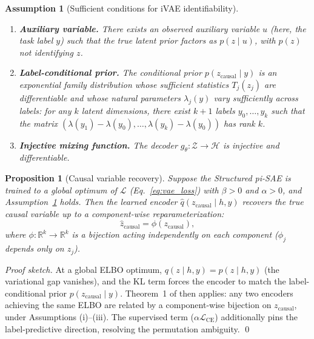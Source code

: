 \documentclass{article}
\newcommand{\R}{\mathbb{R}}
\newtheorem{assumption}{Assumption}
\newtheorem{proposition}{Proposition}
\begin{document}
\begin{assumption}[Sufficient conditions for iVAE identifiability]
\label{ass:ivae}
\leavevmode
\begin{enumerate}[leftmargin=*,label=(\roman*)]
    \item \textbf{Auxiliary variable.} There exists an observed auxiliary
    variable $u$ (here, the task label $y$) such that the true latent prior
    factors as $p(z \mid u)$, with $p(z)$ not identifying $z$.
    \item \textbf{Label-conditional prior.} The conditional prior
    $p(z_\text{causal} \mid y)$ is an exponential family distribution whose
    sufficient statistics $T_j(z_j)$ are differentiable and whose natural
    parameters $\lambda_j(y)$ vary sufficiently across labels: for any
    $k$ latent dimensions, there exist $k{+}1$ labels $y_0, \ldots, y_k$
    such that the matrix $(\lambda(y_1) - \lambda(y_0), \ldots,
    \lambda(y_k) - \lambda(y_0))$ has rank $k$.
    \item \textbf{Injective mixing function.} The decoder
    $g_\theta: \mathcal{Z} \to \mathcal{H}$ is injective and
    differentiable.
\end{enumerate}
\end{assumption}

\begin{proposition}[Causal variable recovery]
\label{prop:recovery}
Suppose the Structured pi-SAE is trained to a global optimum of
$\mathcal{L}$ \emph{(Eq.~\ref{eq:vae_loss})} with $\beta > 0$ and
$\alpha > 0$, and Assumption~\ref{ass:ivae} holds.
Then the learned encoder $\hat{q}(z_\text{causal} \mid h, y)$ recovers the
true causal variable up to a component-wise reparameterization:
\begin{equation}
  \hat{z}_\text{causal} = \phi(z_\text{causal}),
  \label{eq:recovery}
\end{equation}
where $\phi: \R^k \to \R^k$ is a bijection acting
independently on each component ($\phi_j$ depends only on $z_j$).
\end{proposition}

\begin{proof}[Proof sketch]
At a global ELBO optimum, $q(z \mid h, y) = p(z \mid h, y)$ (the
variational gap vanishes), and the KL term forces the encoder to match
the label-conditional prior $p(z_\text{causal} \mid y)$.
Theorem~1 of \citet{khemakhem2020variational} then applies: any two encoders
achieving the same ELBO are related by a component-wise bijection on
$z_\text{causal}$, under Assumptions (i)--(iii).
The supervised term ($\alpha\mathcal{L}_\text{CE}$) additionally pins the
label-predictive direction, resolving the permutation ambiguity. \qed
\end{proof}
\end{document}
